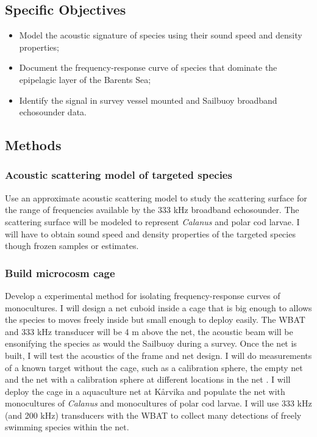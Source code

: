 \documentclass[a4paper, 12pt, Ariel]{article}
\begin{document}
\subsection{Specific Objectives}
\begin{itemize}
\item{Model the acoustic signature of species using their sound speed and density properties;}
\item{Document the frequency-response curve of species that dominate the epipelagic layer of the Barents Sea;}
\item{Identify the signal in survey vessel mounted and Sailbuoy broadband echosounder data.}
\end{itemize}

\subsection{Methods}
\subsubsection{Acoustic scattering model of targeted species}
Use an approximate acoustic scattering model to study the scattering surface for the range of frequencies available by the 333 kHz broadband echosounder. The scattering surface will be modeled to represent \textit{Calanus} and polar cod larvae. I will have to obtain sound speed and density properties of the targeted species though frozen samples or estimates.

\subsubsection {Build microcosm cage} 
Develop a experimental method for isolating frequency-response curves of monocultures. I will design a net cuboid inside a cage that is big enough to allows the species to moves freely inside but small enough to deploy easily. The WBAT and 333 kHz transducer will be 4 m above the net, the acoustic beam will be ensonifying the species as would the Sailbuoy during a survey. Once the net is built, I will test the acoustics of the frame and net design. I will do measurements of a known target without the cage, such as a calibration sphere, the empty net and the net with a calibration sphere at different locations in the net \cite{Foote1990}. I will deploy the cage in a aquaculture net at Kårvika and populate the net with monocultures of \textit{Calanus} and monocultures of polar cod larvae. I will use 333 kHz (and 200 kHz) transducers with the WBAT to collect many detections of freely swimming species within the net.
\end{document}
